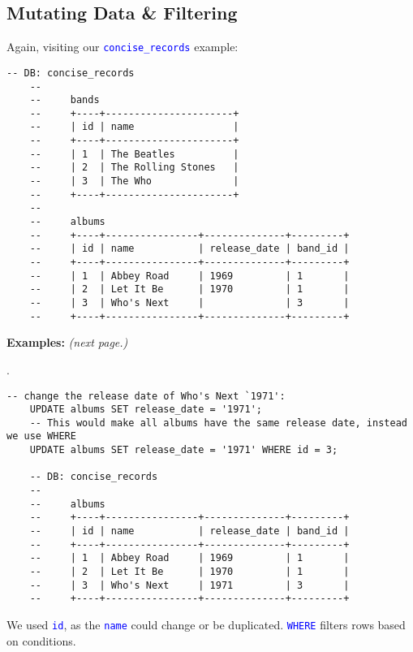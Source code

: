 \subsection{Mutating Data \& Filtering}
\noindent
Again, visiting our \textcolor{blue}{\texttt{concise\_records}} example:

\begin{lstlisting}[style=sql]
    -- DB: concise_records
    --
    --     bands
    --     +----+----------------------+
    --     | id | name                 |
    --     +----+----------------------+
    --     | 1  | The Beatles          |
    --     | 2  | The Rolling Stones   |
    --     | 3  | The Who              |
    --     +----+----------------------+
    --    
    --     albums
    --     +----+----------------+--------------+---------+
    --     | id | name           | release_date | band_id |
    --     +----+----------------+--------------+---------+
    --     | 1  | Abbey Road     | 1969         | 1       |
    --     | 2  | Let It Be      | 1970         | 1       |
    --     | 3  | Who's Next     |              | 3       |
    --     +----+----------------+--------------+---------+
\end{lstlisting}

\vspace{1em}
\noindent
\textbf{Examples:} \textit{(next page.)}

\newpage

.
\begin{lstlisting}[style=sql]
    -- change the release date of Who's Next `1971':
    UPDATE albums SET release_date = '1971';
    -- This would make all albums have the same release date, instead we use WHERE
    UPDATE albums SET release_date = '1971' WHERE id = 3;

    -- DB: concise_records
    --
    --     albums
    --     +----+----------------+--------------+---------+
    --     | id | name           | release_date | band_id |
    --     +----+----------------+--------------+---------+
    --     | 1  | Abbey Road     | 1969         | 1       |
    --     | 2  | Let It Be      | 1970         | 1       |
    --     | 3  | Who's Next     | 1971         | 3       |
    --     +----+----------------+--------------+---------+
\end{lstlisting}

\noindent
We used \textcolor{blue}{\texttt{id}}, as the \textcolor{blue}{\texttt{name}} could change or
be duplicated. \textcolor{blue}{\texttt{WHERE}} filters rows based on conditions.\\

